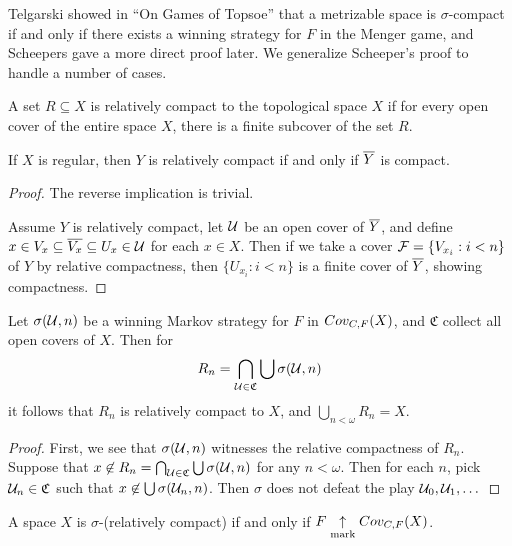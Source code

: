   Telgarski showed in ``On Games of Topsoe'' that a metrizable space is $\sigma$-compact if and only if there exists a winning strategy for $F$ in the Menger game, and Scheepers gave a more direct proof later. We generalize Scheeper's proof to handle a number of cases.

  \begin{definition}
    A set $R\subseteq X$ is relatively compact to the topological space $X$ if for every open cover of the entire space $X$, there is a finite subcover of the set $R$.
  \end{definition}

  \begin{proposition}
    If $X$ is regular, then $Y$ is relatively compact if and only if $\overline{Y}$ is compact.
  \end{proposition}

  \begin{proof}
    The reverse implication is trivial. 

    Assume $Y$ is relatively compact, let $\mathcal{U}$ be an open cover of $\overline{Y}$, and define $x\in V_x\subseteq \overline{V_x}\subseteq U_x \in \mathcal{U}$ for each $x\in X$. Then if we take a cover $\mathcal{F} = \{V_{x_i} : i<n\}$ of $Y$ by relative compactness, then $\{U_{x_i}:i<n\}$ is a finite cover of $\overline{Y}$, showing compactness.
  \end{proof}

  \begin{lemma}
    Let $\sigma(\mathcal{U}, n)$ be a winning Markov strategy for $F$ in $Cov_{C,F}(X)$, and $\mathfrak{C}$ collect all open covers of $X$. Then for
      \[
        R_n = \bigcap_{\mathcal{U}\in\mathfrak{C}} \bigcup\sigma(\mathcal{U},n)
      \]
    it follows that $R_n$ is relatively compact to $X$, and $\bigcup_{n<\omega} R_n = X$.
  \end{lemma}

  \begin{proof}
    First, we see that $\sigma(\mathcal{U},n)$ witnesses the relative compactness of $R_n$. Suppose that $x \not\in R_n = \bigcap_{\mathcal{U}\in\mathfrak{C}} \bigcup\sigma(\mathcal{U},n)$ for any $n<\omega$. Then for each $n$, pick $\mathcal{U}_n\in\mathfrak{C}$ such that $x\not\in \bigcup\sigma(\mathcal{U}_n,n)$. Then $\sigma$ does not defeat the play $\mathcal{U}_0,\mathcal{U}_1,\dots$
  \end{proof}

  \begin{corollary}
    A space $X$ is $\sigma$-(relatively compact) if and only if $F \underset{\text{mark}}{\uparrow} Cov_{C,F}(X)$.
  \end{corollary}

